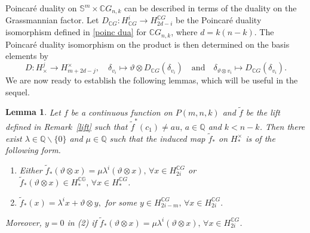 \documentclass{amsart}
\newtheorem{lemma}[theorem]{Lemma}
\newcommand{\remref}[1]{Remark~\ref{#1}}
\begin{document}
		Poincar\'e duality %
on $\mathbb S^{m}\times \mathbb C G_{n,k}$ can be described in terms of the duality on the Grassmannian factor. Let 
		$D_{\mathbb C G}\colon H^{i}_{\mathbb C G}\to H_{2d-i}^{\mathbb C G}$ 
		be the Poincar\'e duality isomorphism defined in \eqref{poinc dua} for $\mathbb C G_{n,k}$, where $d=k(n-k)$.  
		The Poincar\'e duality isomorphism on the product
		is then determined on the basis elements by  
		\begin{equation}
			D\colon H^{j}_{\times}\to H_{m+2d-j}^{\times}, \quad \delta_{v_i}\mapsto \vartheta\otimes D_{\mathbb C G}(\delta_{v_i})\quad\text{and}\quad \delta_{\vartheta\otimes v_i} \mapsto D_{\mathbb C G}(\delta_{v_i}).
		\end{equation}
		We are now ready to %
establish the following lemmas, which %
will be useful in the sequel.
	\begin{lemma}\label{image of homf}
		Let $f$ be a continuous function on $P(m,n,k)$ and $\tilde{f}$ be the lift defined in \remref{lift} such that $\tilde{f}^*(c_1)\neq au,\, a\in \mathbb{Q}$ and $k<n-k$. Then there exist $\lambda \in \mathbb{Q}\backslash \{0\}$ and $\mu \in \mathbb{Q}$ such that the induced map $\tilde{f}_*$ on $H_*^{\times}$ is of the following %
form.
		\begin{enumerate}
			\item Either $\tilde{f}_*(\vartheta\otimes x) = \mu \lambda^i (\vartheta \otimes x),\, \forall x\in H_{2i}^{\mathbb{C}G}$ or $\tilde{f}_*(\vartheta\otimes x) \in H_*^{\mathbb{CG}},\, \forall x \in H_*^{\mathbb{C}G}$.
			\item $\tilde{f}_*(x) = \lambda^i x + \vartheta\otimes y,$ for some $y \in H_{2i-m}^{\mathbb{C}G}, \, \forall x \in H_{2i}^{\mathbb{C}G}.$
		\end{enumerate}
		Moreover, %
$y=0$ in \textit{(2)} if $\tilde{f}_*(\vartheta\otimes x) = \mu \lambda^i (\vartheta \otimes x),\, \forall x\in H_{2i}^{\mathbb{C}G}$.
	\end{lemma}
\end{document}
